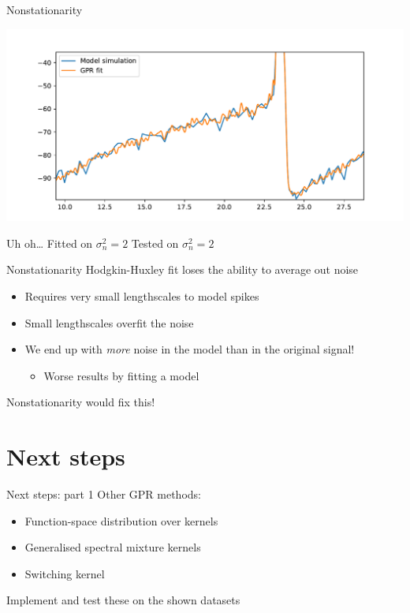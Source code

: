 \documentclass[presentation]{beamer}
\begin{document}
\begin{frame}[label={sec:org43d7b8d}]{Nonstationarity}
\begin{center}
\includegraphics[width=.9\textwidth]{./HH_bad_2.pdf}
\end{center}

Uh oh\ldots{} \hfill Fitted on \(\sigma_n^2=2\) \hfill Tested on \(\sigma_n^2 = 2\)
\end{frame}

\begin{frame}[label={sec:org4b820eb}]{Nonstationarity}
Hodgkin-Huxley fit loses the ability to average out noise
    \vfill
\begin{itemize}
\item Requires very small lengthscales to model spikes
\item Small lengthscales overfit the noise
\item We end up with \emph{more} noise in the model than in the original signal!
\begin{itemize}
\item Worse results by fitting a model
\end{itemize}
\end{itemize}
\vfill
Nonstationarity would fix this!
\end{frame}

\section{Next steps}
\label{sec:orgcb0aeb7}
\begin{frame}[label={sec:org1b145a0}]{Next steps: part 1}
Other GPR methods:
\begin{itemize}
\item Function-space distribution over kernels
\item Generalised spectral mixture kernels
\item Switching kernel

\vfill
\end{itemize}

Implement and test these on the shown datasets
\end{frame}
\end{document}
